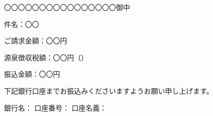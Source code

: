 \documentclass{jlreq}
\newcommand{\請求日}[1]{\flushright{請求日　#1}}
\begin{document}
\請求日{\today}



〇〇〇〇〇〇〇〇〇〇〇〇〇〇〇〇御中




件名：〇〇

ご請求金額：〇〇円

源泉徴収税額：〇〇円（）

振込金額：〇〇円

下記銀行口座までお振込みくださいますようお願い申し上げます。

銀行名：
口座番号：
口座名義：
\end{document}
